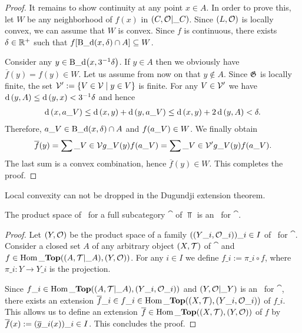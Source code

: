 \begin{proof}
	It remains to show continuity at any point $x \in A$. In order to prove this, let $W$ be any neighborhood of $f(x)$ in $\reltspace[C][O]$. Since $\tspace[L][O]$ is locally convex, we can assume \Wlog that $W$ is convex. Since $f$ is continuous, there exists $\delta \in \R^+$ such that $f\bbraces{\ball[x][\delta][\metric] \cap A} \subseteq W$.
	
	Consider any $y \in \ball[x][3^{-1}\delta][\metric]$. If $y \in A$ then we obviously have $\overline{f}(y) = f(y) \in W$. Let us assume from now on that $y \notin A$. Since $\partition[G]$ is locally finite, the set $\cover[V]^\prime := \Bbraces{V \in \cover[V] \mid y \in V}$ is finite. For any $V \in \cover[V]^\prime$ we have $\metric\pbraces{y, A} \leq \metric\pbraces{y, x} < 3^{-1}\delta$ and hence
	\begin{align*}
		\metric\pbraces{x, a\_V} \leq \metric\pbraces{x, y} + \metric\pbraces{y, a\_V} \leq \metric\pbraces{x, y} + 2 \metric\pbraces{y, A} < \delta.
	\end{align*}
	Therefore, $a\_V \in \ball[x][\delta][\metric] \cap A$ and $f\pbraces{a\_V} \in W$. We finally obtain
	\begin{align*}
		\overline{f}(y) = \sum\_{V \in \cover[V]} g\_V(y) f(a\_V) = \sum\_{V \in \cover[V]^\prime} g\_V(y) f(a\_V).
	\end{align*}
	The last sum is a convex combination, hence $\overline{f}(y) \in W$. This completes the proof. 
\end{proof}

\begin{remark}
	Local convexity can not be dropped in the Dugundji extension theorem.\cite[remark1.2.4]{IDT}
\end{remark}

\begin{proposition}
	The product space of \aexs\ for a full subcategory $\cat$ of $\Top$ is an \aex\ for $\cat$. 
\end{proposition}
\begin{proof}
	Let $\tspace[Y][O]$ be the product space of a family $\pbraces{\indtspace[Y][O]}\_{i \in I}$ of \aexs\ for $\cat$. Consider a closed set $A$ of any arbitrary object $\tspace$ of $\cat$ and $f \in \Hom\_\Top\pbraces{\reltspace, \tspace[Y][O]}$. For any $i \in I$ we define $f\_i := \pi\_i \circ f$, where $\pi\_i: Y \to Y\_i$ is the projection. 
	Since $f\_i \in \Hom\_\Top\pbraces{\reltspace, \indtspace[Y][O]}$ and $\reltspace[Y][O]$ is an \aex\ for $\cat$, there exists an extension $\overline{f}\_i \in f\_i \in \Hom\_\Top\pbraces{\tspace, \indtspace[Y][O]}$ of $f\_i$. This allows us to define an extension $\overline{f} \in \Hom\_\Top\pbraces{\tspace, \tspace[Y][O]}$ of $f$ by $\overline{f}(x) := \pbraces{\overline{g}\_i(x)}\_{i \in I}$. This concludes the proof. 
\end{proof}
